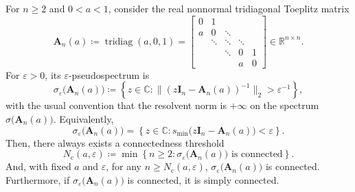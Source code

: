 \documentclass[11pt]{article}
\title{}
\author{}
\date{}
\begin{document}
\maketitle

For \(n\ge 2\) and \(0<a<1\), consider the real nonnormal tridiagonal Toeplitz matrix
\[
\mathbf{A}_n(a)\coloneqq \operatorname{tridiag}(a,0,1)
=
\begin{bmatrix}
0 & 1 \\
a & 0 & \ddots \\
& \ddots & \ddots & \ddots \\
&& \ddots & 0 & 1 \\
&&& a & 0
\end{bmatrix}\in \mathbb{R}^{n\times n}.
\]
For \(\varepsilon>0\), its \(\varepsilon\)-pseudospectrum is
\[
\sigma_\varepsilon\bigl(\mathbf{A}_n(a)\bigr)
\coloneqq
\left\{
z\in\mathbb C\colon
\bigl\|(z\mathbf I_n-\mathbf A_n(a))^{-1}\bigr\|_2>\varepsilon^{-1}
\right\},
\]
with the usual convention that the resolvent norm is \(+\infty\) on the spectrum \(\sigma\bigl(\mathbf{A}_n(a)\bigr)\).
Equivalently,
\[
\sigma_\varepsilon\bigl(\mathbf A_n(a)\bigr)
=
\left\{
z\in\mathbb C\colon
s_{\min}\bigl(z\mathbf I_n-\mathbf A_n(a)\bigr)<\varepsilon
\right\}.
\]
Then, there always exists a connectedness threshold
\[
N_{\text{c}}(a, \varepsilon)\coloneqq\min \left\{n \geq 2\colon \sigma_\varepsilon\bigl(\mathbf{A}_n(a)\bigr) \text { is connected}\right\}.
\]
And, with fixed \(a\) and \(\varepsilon\), for any \(n\ge N_{\text{c}}(a, \varepsilon)\), \(\sigma_\varepsilon\bigl(\mathbf{A}_n(a)\bigr)\) is connected.
Furthermore, if \(\sigma_\varepsilon\bigl(\mathbf{A}_n(a)\bigr)\) is connected, it is simply connected.
\end{document}
